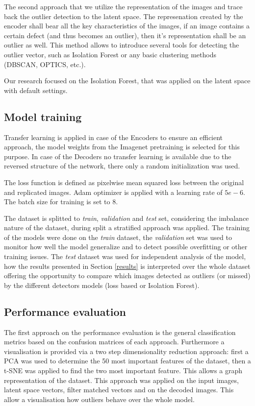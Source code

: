 The second approach that we utilize the representation of the images and trace back the outlier
detection to the latent space.
The represenation created by the encoder shall bear all the key characteristics of the images,
if an image contains a certain defect (and thus becomes an outlier), then it's representation
shall be an outlier as well.
This method allows to introduce several tools for detecting the outlier vector,
such as Isolation Forest or any basic clustering methods (DBSCAN, OPTICS, etc.).

Our research focused on the Isolation Forest, that was applied on the latent space with default
settings.

\subsection{Model training}
Transfer learning is applied in case of the Encoders to ensure an efficient approach,
the model weights from the Imagenet pretraining is selected for this purpose.
In case of the Decoders no transfer learning is available due to the reversed structure
of the network, there only a random initialization was used.

The loss function is defined as pixelwise mean squared loss between the original and replicated
images.
Adam optimizer is applied with a learning rate of $5e-6$.
The batch size for training is set to 8.

The dataset is splitted to \emph{train}, \emph{validation} and \emph{test} set, considering the
imbalance nature of the dataset, during split a stratified approach was applied.
The training of the models were done on the \emph{train} dataset,
the \emph{validation} set was used to monitor how well the model generalize and to detect possible
overfitting or other training issues.
The \emph{test} dataset was used for independent analysis of the model, how the results presented
in Section \ref{results} is interpreted over the whole dataset offering the opportunity to compare 
which images detected as outliers (or missed) by the different detectors models (loss based or
Isolation Forest). 

\subsection{Performance evaluation}
The first approach on the performance evaluation is the general classification metrics based on
the confusion matrices of each approach.
Furthermore a visualisation is provided via a two step dimensionality reduction approach:
first a PCA was used to determine the 50 most important features of the dataset,
then a t-SNE was applied to find the two most important feature.
This allows a graph representation of the dataset.
This approach was applied on the input images, latent space vectors, filter matched vectors and on
the decoded images.
This allow a visualisation how outliers behave over the whole model.

